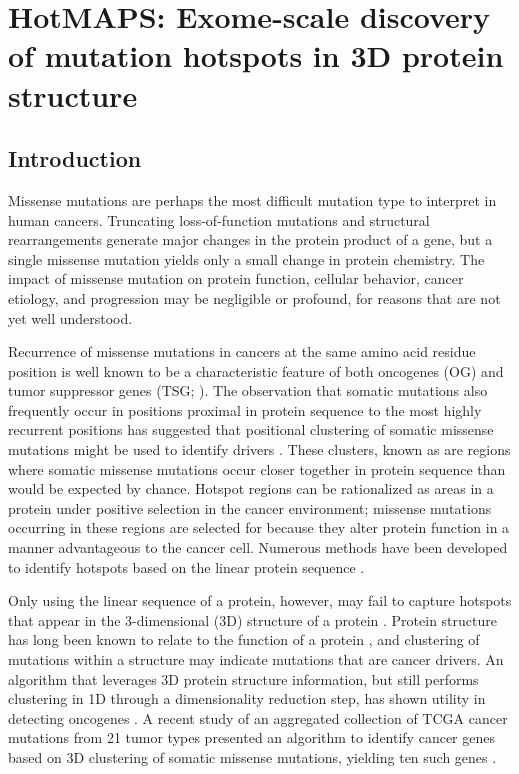 
\chapter{HotMAPS: Exome-scale discovery of mutation hotspots in 3D protein structure}
\label{chap:ch5}

\section{Introduction}

Missense mutations are perhaps the most difficult mutation type to interpret in human cancers. Truncating loss-of-function mutations and structural rearrangements generate major changes in the protein product of a gene, but a single missense mutation yields only a small change in protein chemistry. The impact of missense mutation on protein function, cellular behavior, cancer etiology, and progression may be negligible or profound, for reasons that are not yet well understood. 

Recurrence of missense mutations in cancers at the same amino acid residue position is well known to be a characteristic feature of both oncogenes (OG) and tumor suppressor genes (TSG; \cite{RN107}). The observation that somatic mutations also frequently occur in positions proximal in protein sequence to the most highly recurrent positions has suggested that positional clustering of somatic missense mutations might be used to identify drivers \cite{RN109}. These clusters, known as  are regions where somatic missense mutations occur closer together in protein sequence than would be expected by chance. Hotspot regions can be rationalized as areas in a protein under positive selection in the cancer environment; missense mutations occurring in these regions are selected for because they alter protein function in a manner advantageous to the cancer cell. Numerous methods have been developed to identify hotspots based on the linear protein sequence \cite{RN16, RN46, RN110, RN87, RN54, RN55}.

Only using the linear sequence of a protein, however, may fail to capture hotspots that appear in the 3-dimensional (3D) structure of a protein \cite{RN105}. Protein structure has long been known to relate to the function of a protein \cite{RN112, RN113}, and clustering of mutations within a structure may indicate mutations that are cancer drivers. An algorithm that leverages 3D protein structure information, but still performs clustering in 1D through a dimensionality reduction step, has shown utility in detecting oncogenes \cite{RN15}. A recent study of an aggregated collection of TCGA cancer mutations from 21 tumor types presented an algorithm to identify cancer genes based on 3D clustering of somatic missense mutations, yielding ten such genes \cite{RN105}. 

